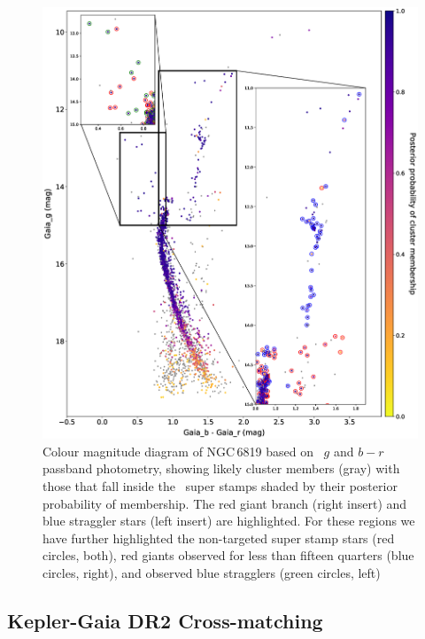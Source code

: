 \begin{figure}
\centering
\includegraphics[width=\linewidth]{Chapter4/cmd_6819.eps}
\caption[NGC\,6819 CMD]{Colour magnitude diagram of NGC\,6819 based on \Gaia~$g$ and $b-r$ passband photometry, showing likely cluster members (gray) with those that fall inside the \Kepler~super stamps shaded by their posterior probability of membership. The red giant branch (right insert) and blue straggler stars (left insert) are highlighted. For these regions we have further highlighted the non-targeted super stamp stars (red circles, both), red giants observed for less than fifteen quarters (blue circles, right), and observed blue stragglers (green circles, left)}
\end{figure}

\subsection{Kepler-Gaia DR2 Cross-matching}


